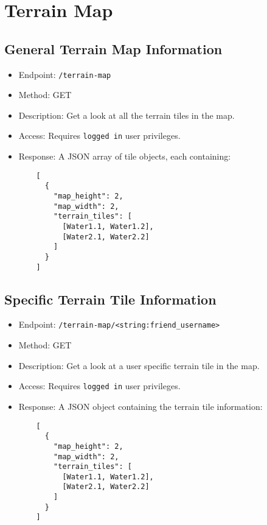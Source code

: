 \documentclass[12pt]{article}
\begin{document}
\section{Terrain Map}

\subsection{General Terrain Map Information}
\begin{itemize}
    \item Endpoint: \texttt{/terrain-map}
    \item Method: GET
    \item Description: Get a look at all the terrain tiles in the map.
    \item Access: Requires \texttt{logged in} user privileges.
    \item Response: A JSON array of tile objects, each containing:
    \begin{verbatim}
    [
      {
        "map_height": 2,
        "map_width": 2,
        "terrain_tiles": [
          [Water1.1, Water1.2],
          [Water2.1, Water2.2]
        ]
      }
    ]
    \end{verbatim}
\end{itemize}

\subsection{Specific Terrain Tile Information}
\begin{itemize}
    \item Endpoint: \texttt{/terrain-map/<string:friend\_username>}
    \item Method: GET
    \item Description: Get a look at a user specific terrain tile in the map.
    \item Access: Requires \texttt{logged in} user privileges.
    \item Response: A JSON object containing the terrain tile information:
    \begin{verbatim}
    [
      {
        "map_height": 2,
        "map_width": 2,
        "terrain_tiles": [
          [Water1.1, Water1.2],
          [Water2.1, Water2.2]
        ]
      }
    ]
    \end{verbatim}
\end{itemize}
\end{document}
